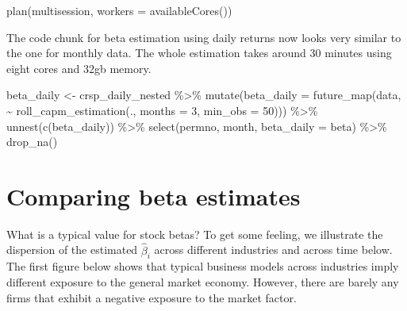 \documentclass[
]{krantz}
\newenvironment{Shaded}{\begin{snugshade}}{\end{snugshade}}
\newcommand{\AttributeTok}[1]{\textcolor[rgb]{0.61,0.61,0.61}{#1}}
\newcommand{\DecValTok}[1]{\textcolor[rgb]{0.06,0.06,0.06}{#1}}
\newcommand{\FunctionTok}[1]{\textcolor[rgb]{0,0,0}{#1}}
\newcommand{\NormalTok}[1]{#1}
\newcommand{\OtherTok}[1]{\textcolor[rgb]{0.37,0.37,0.37}{#1}}
\newcommand{\SpecialCharTok}[1]{\textcolor[rgb]{0,0,0}{#1}}
\begin{document}
\begin{Shaded}
\begin{Highlighting}[]
\FunctionTok{plan}\NormalTok{(multisession, }\AttributeTok{workers =} \FunctionTok{availableCores}\NormalTok{())}
\end{Highlighting}
\end{Shaded}

The code chunk for beta estimation using daily returns now looks very similar to the one for monthly data. The whole estimation takes around 30 minutes using eight cores and 32gb memory.

\begin{Shaded}
\begin{Highlighting}[]
\NormalTok{beta\_daily }\OtherTok{\textless{}{-}}\NormalTok{ crsp\_daily\_nested }\SpecialCharTok{\%\textgreater{}\%}
  \FunctionTok{mutate}\NormalTok{(}\AttributeTok{beta\_daily =} \FunctionTok{future\_map}\NormalTok{(data, }\SpecialCharTok{\textasciitilde{}} \FunctionTok{roll\_capm\_estimation}\NormalTok{(., }\AttributeTok{months =} \DecValTok{3}\NormalTok{, }\AttributeTok{min\_obs =} \DecValTok{50}\NormalTok{))) }\SpecialCharTok{\%\textgreater{}\%}
  \FunctionTok{unnest}\NormalTok{(}\FunctionTok{c}\NormalTok{(beta\_daily)) }\SpecialCharTok{\%\textgreater{}\%}
  \FunctionTok{select}\NormalTok{(permno, month, }\AttributeTok{beta\_daily =}\NormalTok{ beta) }\SpecialCharTok{\%\textgreater{}\%}
  \FunctionTok{drop\_na}\NormalTok{()}
\end{Highlighting}
\end{Shaded}

\hypertarget{comparing-beta-estimates}{%
\section{Comparing beta estimates}\label{comparing-beta-estimates}}

What is a typical value for stock betas? To get some feeling, we illustrate the dispersion of the estimated \(\hat\beta_i\) across different industries and across time below. The first figure below shows that typical business models across industries imply different exposure to the general market economy. However, there are barely any firms that exhibit a negative exposure to the market factor.
\end{document}
